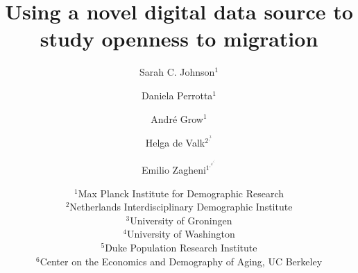 \documentclass[12pt]{article}
\begin{document}


\title{Using a novel digital data source to study openness to migration}
\author{%
Sarah C. Johnson$^1$ \and
Daniela Perrotta$^1$ \and
Andr\'{e} Grow$^1$ \and
Helga de Valk$^2^,^3$ \and
Emilio Zagheni$^1^,^4^,^5^,^6$}
\date{%
    $^1$Max Planck Institute for Demographic Research\\%
    $^2$Netherlands Interdisciplinary Demographic Institute\\%
    $^3$University of Groningen\\%
    $^4$University of Washington\\%
    $^5$Duke Population Research Institute\\%
    $^6$Center on the Economics and Demography of Aging, UC Berkeley\\
}
\maketitle

\printbibliography
\end{document}

